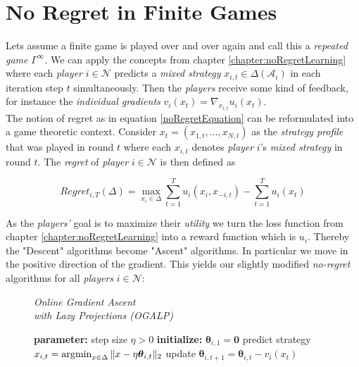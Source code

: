\section{No Regret in Finite Games}\label{section:noRegretInFiniteGames}

Lets assume a finite game is played over and over again and call this a \textit{repeated game} $\Gamma^{\infty}$. We can apply the concepts from chapter \ref{chapter:noRegretLearning} where each \textit{player} $i \in \mathcal{N}$ predicts a \textit{mixed strategy} $x_{i,t} \in \Delta(\mathcal{A}_i)$ in each iteration step $t$ simultaneously. Then the \textit{players} receive some kind of feedback, for instance the \textit{individual gradients} $v_{i}(x_t) = \nabla_{x_{i,t}}u_{i}(x_t)$. \\

The notion of regret as in equation \ref{noRegretEquation} can be reformulated into a game theoretic context. Consider $x_t = (x_{1,t},\dots,x_{N,t})$ as the \textit{strategy profile} that was played in round $t$ where each $x_{i,t}$ denotes \textit{player} $i$'s \textit{mixed strategy} in round $t$. The \textit{regret} of \textit{player} $i \in \mathcal{N}$ is then defined as

\begin{equation*}
    Regret_{i,T}(\Delta) = \max_{x_i \in \Delta}\sum_{t=1}^{T} u_i(x_i,x_{-i,t}) - \sum_{t=1}^{T}u_i(x_t)
\end{equation*}

As the \textit{players'} goal is to maximize their \textit{utility} we turn the loss function from chapter \ref{chapter:noRegretLearning} into a reward function which is $u_i$. Thereby the "Descent" algorithms become "Ascent" algorithms. In particular we move in the positive direction of the gradient. This yields our slightly modified \textit{no-regret} algorithms for all \textit{players} $i \in \mathcal{N}$:

\begin{figure}[H]\centering
    \textit{Online Gradient Ascent \\ with Lazy Projections (OGALP)} 
    \begin{minipage}{.7\linewidth}
        \begin{algorithm}[H]
        \DontPrintSemicolon
        \textbf{parameter: } step size $\eta > 0$ \;
        \textbf{initialize: } $\boldsymbol{\theta}_{i,1} = \textbf{0}$ \;
         {
        predict strategy $x_{i,t} = \operatorname*{\arg\!\min}_{x \in \Delta} \|x - \eta\boldsymbol{\theta}_{i,t}\|_2$ \;
        update $\boldsymbol{\theta}_{i,t+1} = \boldsymbol{\theta}_{i,t}- v_{i}(x_t)$ \;
        }
        \end{algorithm}\caption*{}
  \end{minipage}
\end{figure}

